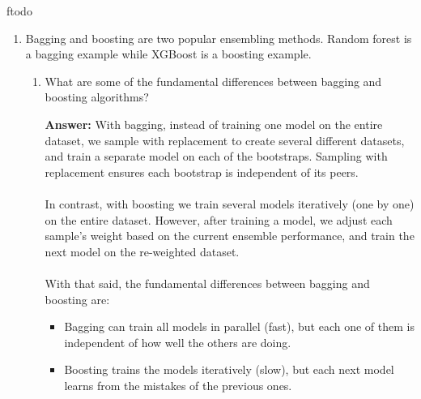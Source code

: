 ƒtodo\documentclass{article}
\newenvironment{QandA}{\begin{enumerate}[label=\arabic*.]}{\end{enumerate}}
\newenvironment{InnerQandA}{\begin{enumerate}[label=\roman*.]}{\end{enumerate}}
\newenvironment{answer}{\par\normalfont \textbf{Answer:}}{}
\begin{document}
\begin{QandA}
\begin{InnerQandA}
\begin{answer}
            (Source: \href{https://www.youtube.com/watch?v=4FG0TWJRRPI&ab_channel=CarletonAISociety}{CAIS})
        \end{answer}

        \item When would you choose one over another?
        \begin{answer}
            In general case, it would be advisable to default to using GMMs, since they generalize better to various cluster shapes. However, given some prior knowledge that the clusters are supposed to have spherical shapes, it might be beneficial to use K-Means as it explicitly encodes this property.
        \end{answer}
    \end{InnerQandA}

    \item Bagging and boosting are two popular ensembling methods. Random forest is a bagging example while XGBoost is a boosting example.
    \begin{InnerQandA}
        \item What are some of the fundamental differences between bagging and boosting algorithms?
        \begin{answer}
            With bagging, instead of training one model on the entire dataset, we sample with replacement to create several different datasets, and train a separate model on each of the bootstraps. Sampling with replacement ensures each bootstrap is independent of its peers. \\\\
            In contrast, with boosting we train several models iteratively (one by one) on the entire dataset. However, after training a model, we adjust each sample's weight based on the current ensemble performance, and train the next model on the re-weighted dataset.\\\\
            With that said, the fundamental differences between bagging and boosting are:
            \begin{itemize}
                \item Bagging can train all models in parallel (fast), but each one of them is independent of how well the others are doing. 
                \item Boosting trains the models iteratively (slow), but each next model learns from the mistakes of the previous ones.
            \end{itemize}
        \end{answer}


\end{InnerQandA}
\end{QandA}
\end{document}
